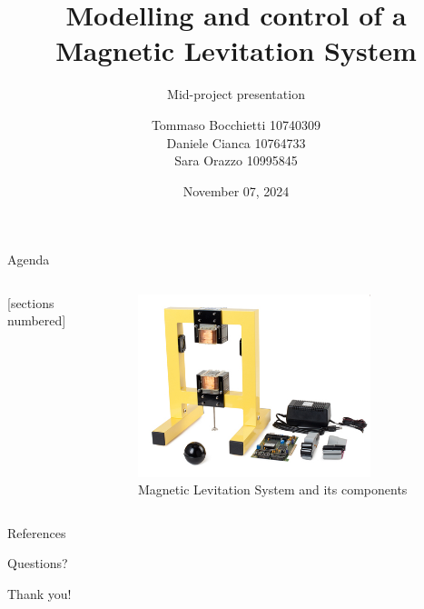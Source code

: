 \documentclass[9pt]{beamer}
\title{Modelling and control of a Magnetic Levitation System}
\subtitle{Mid-project presentation}
\date{November 07, 2024}
\author{Tommaso Bocchietti 10740309 \\ Daniele Cianca 10764733 \\ Sara Orazzo 10995845}
\institute{Politecnico di Milano}
\begin{document}
\maketitle

\begin{frame}{Agenda}

    \begin{columns}[c, onlytextwidth]

        \begin{column}{0.3\textwidth}

            [sections numbered]
            \tableofcontents

        \end{column}

        \begin{column}{0.7\textwidth}

            \begin{figure}[H]
                \centering
                \includegraphics[width=0.8\textwidth]{img/maglev_and_components.jpg}
                \caption{Magnetic Levitation System and its components}
            \end{figure}

        \end{column}

    \end{columns}

\end{frame}







\appendix

\begin{frame}[allowframebreaks]{References}
    \nocite{*}
    
\end{frame}

\begin{frame}[standout]
    Questions?
\end{frame}

\begin{frame}[standout]
    Thank you!
\end{frame}
\end{document}
